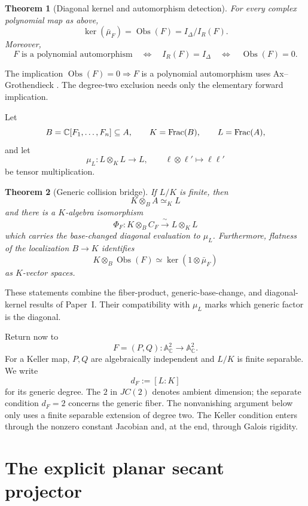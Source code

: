 \documentclass[11pt]{article}
\newtheorem{theorem}{Theorem}[section]
\newcommand{\A}{\mathbb A}
\newcommand{\C}{\mathbb C}
\newcommand{\Obs}{\operatorname{Obs}}
\begin{document}
\begin{theorem}[Diagonal kernel and automorphism detection]
\label{thm:quoted-diagonal-kernel}
For every complex polynomial map as above,
\[
  \ker(\bar\mu_F)=\Obs(F)=I_\Delta/I_R(F).
\]
Moreover,
\[
  F\text{ is a polynomial automorphism}
  \quad\Longleftrightarrow\quad
  I_R(F)=I_\Delta
  \quad\Longleftrightarrow\quad
  \Obs(F)=0.
\]
\end{theorem}

The implication \(\Obs(F)=0\Rightarrow F\) is a polynomial automorphism
uses Ax--Grothendieck
\cite{Ax1969}.  The degree-two exclusion needs only the elementary
forward implication.

Let
\[
  B=\C[F_1,\dots,F_n]\subseteq A,\qquad
  K=\Frac(B),\qquad
  L=\Frac(A),
\]
and let
\[
  \mu_L\colon L\otimes_KL\longrightarrow L,
  \qquad \ell\otimes\ell'\longmapsto\ell\ell'
\]
be tensor multiplication.

\begin{theorem}[Generic collision bridge]
\label{thm:quoted-generic-bridge}
If \(L/K\) is finite, then
\[
  K\otimes_BA\simeq_KL
\]
and there is a \(K\)-algebra isomorphism
\[
  \Phi_F\colon K\otimes_BC_F\xrightarrow{\ \sim\ }L\otimes_KL
\]
which carries the base-changed diagonal evaluation to \(\mu_L\).
Furthermore, flatness of the localization \(B\to K\) identifies
\[
  K\otimes_B\Obs(F)
  \simeq
  \ker(1\otimes\bar\mu_F)
\]
as \(K\)-vector spaces.
\end{theorem}

These statements combine the fiber-product, generic-base-change, and
diagonal-kernel results of Paper~I.  Their compatibility with \(\mu_L\)
marks which generic factor is the diagonal.

Return now to
\[
  F=(P,Q)\colon\A^2_{\C}\longrightarrow\A^2_{\C}.
\]
For a Keller map, \(P,Q\) are algebraically independent and \(L/K\) is
finite separable.  We write
\[
  d_F:=[L:K]
\]
for its generic degree.  The \(2\) in \(JC(2)\) denotes ambient dimension;
the separate condition \(d_F=2\) concerns the generic fiber.  The
nonvanishing argument below only uses a finite separable extension of
degree two.  The Keller condition enters through the nonzero constant
Jacobian and, at the end, through Galois rigidity.

\section{The explicit planar secant projector}
\label{sec:secant-projector}
\end{document}
